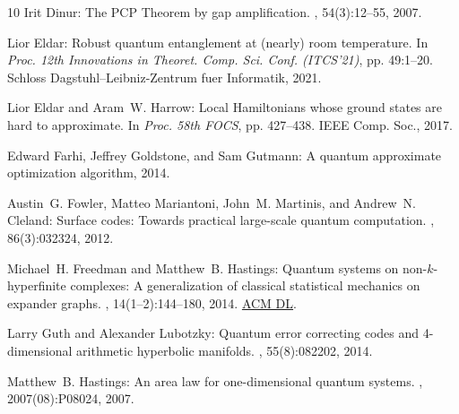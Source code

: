 \documentclass[11pt]{article}
\begin{document}
\begin{thebibliography}{10}
{\sc Irit Dinur}: The {PCP} {T}heorem by gap amplification.
, 54(3):12--55, 2007.
\newblock [\epfmtdoi{10.1145/1236457.1236459}]

{\sc Lior Eldar}: Robust quantum entanglement at (nearly) room temperature.
\newblock In {\em Proc. 12th Innovations in Theoret. Comp. Sci. Conf.
  (ITCS'21)}, pp. 49:1--20. Schloss Dagstuhl--Leibniz-Zentrum fuer Informatik,
  2021.

{\sc Lior {Eldar} and Aram~W. {Harrow}}: Local {H}amiltonians whose ground
  states are hard to approximate.
\newblock In {\em Proc. 58th FOCS}, pp. 427--438. IEEE Comp. Soc., 2017.

{\sc Edward Farhi, Jeffrey Goldstone, and Sam Gutmann}: A quantum approximate
  optimization algorithm, 2014.

{\sc Austin~G. Fowler, Matteo Mariantoni, John~M. Martinis, and Andrew~N.
  Cleland}: Surface codes: {T}owards practical large-scale quantum computation.
, 86(3):032324, 2012.

{\sc Michael~H. Freedman and Matthew~B. Hastings}: Quantum systems on
  non-$k$-hyperfinite complexes: A generalization of classical statistical
  mechanics on expander graphs.
, 14(1--2):144--180, 2014.
\newblock \href{http://dl.acm.org/doi/10.5555/2600498.2600507}{ACM DL}.

{\sc Larry Guth and Alexander Lubotzky}: Quantum error correcting codes and
  4-dimensional arithmetic hyperbolic manifolds.
, 55(8):082202, 2014.
\newblock [\epfmtdoi{10.1063/1.4891487}]

{\sc Matthew~B. Hastings}: An area law for one-dimensional quantum systems.
, 2007(08):P08024, 2007.
\newblock [\epfmtdoi{10.1088/1742-5468/2007/08/P08024}]


\end{thebibliography}
\end{document}
